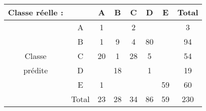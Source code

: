\begin{tabular}{c|c|c|c|c|c|c|c}
Classe réelle :&	&A&	B&	C&	D&	E&	Total\\
\hline
\hline
&	A&	1&	&	2&	&	&	3\\
	&	B&	1&	9&	4&	80&	&	94\\
	Classe &	C&	20&	1&	28&	5&	&	54\\
	prédite&	D&	&	18&	&	1&	&	19\\
	&	E&	1&	&	&	&	59&	60\\
\hline
	&	Total&	23&	28&	34&	86&	59&	230\\
\end{tabular}
